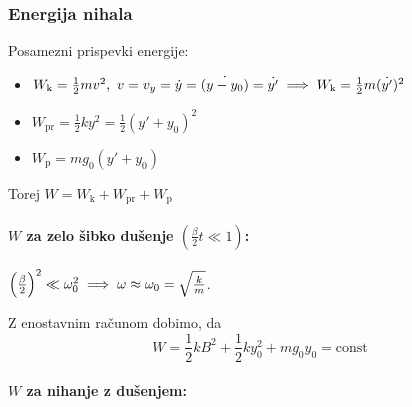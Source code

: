 \subsubsection*{Energija nihala}
Posamezni prispevki energije:
\begin{itemize}
    \item \(W_\text{k} = \frac{1}{2}mv^2, \ v = v_y = \dot{y} = \dot{(y - y_0)} = \dot{y'} \implies W_\text{k} = \frac{1}{2}m (\dot{y'})^2\)
    \item \(W_\text{pr} = \frac{1}{2}ky^2 = \frac{1}{2}(y' + y_0)^2\)
    \item \(W_\text{p} = mg_0(y'+y_0)\)
\end{itemize}

Torej \(\boxed{W = W_\text{k} + W_\text{pr} + W_\text{p}}\)

\paragraph{\(W\) za zelo šibko dušenje \(\left(\frac{\beta}{2}t \ll 1\right)\):}

\(\left(\frac{\beta}{2}\right)^2 \ll \omega_0^2 \implies \omega \approx \omega_0 = \sqrt{\frac{k}{m}}\).

Z enostavnim računom dobimo, da \[\boxed{W = \frac{1}{2}kB^2 + \frac{1}{2}ky_0^2 + mg_0y_0 = \text{const}}\]

\paragraph{\(W\) za nihanje z dušenjem:} 

\newpage
